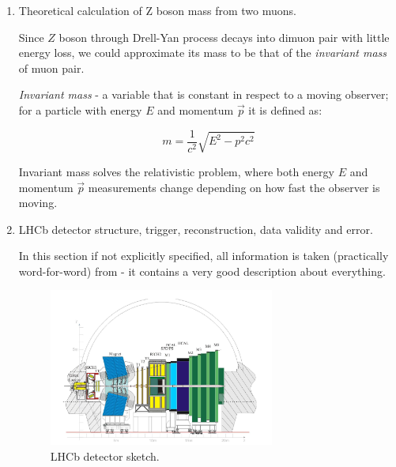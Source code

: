 \documentclass[11pt,a4paper,twoside]{article}
\begin{document}
\begin{enumerate}
        \item Theoretical calculation of Z boson mass from two muons.


        Since $Z$ boson through Drell-Yan process decays into dimuon pair with little energy loss, we could approximate its mass to be that of the \textit{invariant mass} of muon pair.

        \textit{Invariant mass} - a variable that is constant in respect to a moving observer; for a particle with energy $E$ and momentum $\vec{p}$ it is defined as:

        \begin{equation}
            m = \frac{1}{c^2} \sqrt{E^2 - p^2c^2}
            \label{eq:001-invariant-mass}
        \end{equation}

        Invariant mass solves the relativistic problem, where both energy $E$ and momentum $\vec{p}$ measurements change depending on how fast the observer is moving. 


        

        \item LHCb detector structure, trigger, reconstruction, data validity and error.

        In this section if not explicitly specified, all information is taken (practically word-for-word) from \cite{Bursche:2014ltl} - it contains a very good description about everything.

        \begin{figure}[H]
            \centering

            \includegraphics[width=0.7\textwidth]{visuals/005-LHCb-detector.png}
            
            \caption{LHCb detector sketch.}
            \label{fig:001-LHCb_detector}
        \end{figure}

        \begin{figure}[H]
            \centering


\end{figure}
\end{enumerate}
\end{document}
